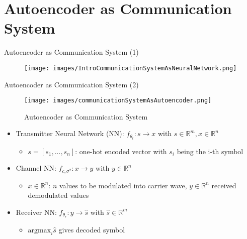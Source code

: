 \documentclass[xcolor=table,mathserif,9pt]{beamer}    %
\begin{document}
\section{Autoencoder as Communication System}
\begin{frame}{Autoencoder as Communication System (1)}

\vspace{1em}
\begin{figure}[htpb]
	\centering
	\texttt{[image: images/IntroCommunicationSystemAsNeuralNetwork.png]}
\end{figure}

\end{frame}

\begin{frame}{Autoencoder as Communication System (2)}

\begin{figure}[htpb]
	\centering
	\texttt{[image: images/communicationSystemAsAutoencoder.png]}
	\caption{Autoencoder as Communication System \cite{synch1}}
	\label{fig:autoencoder}
\end{figure}

\begin{itemize}
	\item Transmitter Neural Network (NN): \emph{$f_{\theta_t}: s \to x$} with $s \in \mathbb{R}^m, x \in \mathbb{R}^n$
	\begin{itemize}
		\item $s = \left[s_1,...,s_n\right]$: one-hot encoded vector with $s_i$ being the i-th symbol 
	\end{itemize}
	\item Channel NN: \emph{$f_{c, \sigma^2}: x \to y$} with $y \in \mathbb{R}^n$
	\begin{itemize}
		\item $x \in \mathbb{R}^n$: $n$ values to be modulated into carrier wave, $y \in \mathbb{R}^n$ received demodulated values
	\end{itemize}
	\item Receiver NN: \emph{$f_{\theta_r}: y \to \hat{s}$} with $\hat{s} \in \mathbb{R}^m$
	\begin{itemize}
		\item $\text{argmax}_i\hat{s}$ gives decoded symbol
	\end{itemize}
\end{itemize}

\end{frame}
\end{document}
